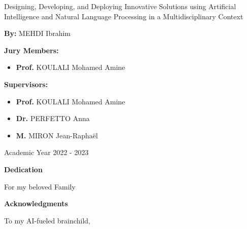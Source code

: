 \documentclass[a4paper,12pt,twoside]{report}
\begin{document}
\begin{titlepage}
\begin{center}
    \hrulefill\par
    \LARGE Designing, Developing, and Deploying Innovative Solutions using Artificial Intelligence and Natural Language Processing in a Multidisciplinary Context\par
    \hrulefill\par
\end{center}
\vfill

\begin{center}
\textbf{By:}
    MEHDI Ibrahim

\end{center}

\vfill


\begin{multicols}{2}
\noindent \textbf{Jury Members:}
\begin{itemize}[label=\textbullet, leftmargin=*]
  \item \textbf{Prof.} KOULALI Mohamed Amine
\end{itemize}

\columnbreak

\noindent \textbf{Supervisors:}
\begin{itemize}[label=\textbullet, leftmargin=*]
  \item \textbf{Prof.} KOULALI Mohamed Amine
  \item \textbf{Dr.} PERFETTO Anna
  \item \textbf{M.} MIRON Jean-Raphaël
\end{itemize}

\end{multicols}

\begin{center}
    Academic Year 2022 - 2023
\end{center}

\end{titlepage}

\newpage

\begin{center}
    \Large{\textbf{Dedication}}
\end{center}


\begin{center}
    \Large{For my beloved Family}
\end{center}
\newpage
\thispagestyle{empty}
\begin{center}
    \Large\textbf{Acknowledgments}
\end{center}
To my AI-fueled brainchild,
\end{document}
